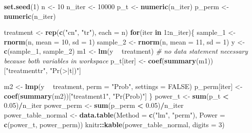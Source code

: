 \documentclass[]{book}
\newenvironment{Shaded}{\begin{snugshade}}{\end{snugshade}}
\newcommand{\CommentTok}[1]{\textcolor[rgb]{0.56,0.35,0.01}{\textit{#1}}}
\newcommand{\ControlFlowTok}[1]{\textcolor[rgb]{0.13,0.29,0.53}{\textbf{#1}}}
\newcommand{\DataTypeTok}[1]{\textcolor[rgb]{0.13,0.29,0.53}{#1}}
\newcommand{\DecValTok}[1]{\textcolor[rgb]{0.00,0.00,0.81}{#1}}
\newcommand{\FloatTok}[1]{\textcolor[rgb]{0.00,0.00,0.81}{#1}}
\newcommand{\KeywordTok}[1]{\textcolor[rgb]{0.13,0.29,0.53}{\textbf{#1}}}
\newcommand{\NormalTok}[1]{#1}
\newcommand{\OperatorTok}[1]{\textcolor[rgb]{0.81,0.36,0.00}{\textbf{#1}}}
\newcommand{\OtherTok}[1]{\textcolor[rgb]{0.56,0.35,0.01}{#1}}
\newcommand{\StringTok}[1]{\textcolor[rgb]{0.31,0.60,0.02}{#1}}
\begin{document}
\begin{Shaded}
\begin{Highlighting}[]
\KeywordTok{set.seed}\NormalTok{(}\DecValTok{1}\NormalTok{)}
\NormalTok{n <-}\StringTok{ }\DecValTok{10}
\NormalTok{n_iter <-}\StringTok{ }\DecValTok{10000}
\NormalTok{p_t <-}\StringTok{ }\KeywordTok{numeric}\NormalTok{(n_iter)}
\NormalTok{p_perm <-}\StringTok{ }\KeywordTok{numeric}\NormalTok{(n_iter)}

\NormalTok{treatment <-}\StringTok{ }\KeywordTok{rep}\NormalTok{(}\KeywordTok{c}\NormalTok{(}\StringTok{"cn"}\NormalTok{, }\StringTok{"tr"}\NormalTok{), }\DataTypeTok{each =}\NormalTok{ n)}
\ControlFlowTok{for}\NormalTok{(iter }\ControlFlowTok{in} \DecValTok{1}\OperatorTok{:}\NormalTok{n_iter)\{}
\NormalTok{  sample_}\DecValTok{1}\NormalTok{ <-}\StringTok{ }\KeywordTok{rnorm}\NormalTok{(n, }\DataTypeTok{mean =} \DecValTok{10}\NormalTok{, }\DataTypeTok{sd =} \DecValTok{1}\NormalTok{)}
\NormalTok{  sample_}\DecValTok{2}\NormalTok{ <-}\StringTok{ }\KeywordTok{rnorm}\NormalTok{(n, }\DataTypeTok{mean =} \DecValTok{11}\NormalTok{, }\DataTypeTok{sd =} \DecValTok{1}\NormalTok{)}
\NormalTok{  y <-}\StringTok{ }\KeywordTok{c}\NormalTok{(sample_}\DecValTok{1}\NormalTok{, sample_}\DecValTok{2}\NormalTok{)}
\NormalTok{  m1 <-}\StringTok{ }\KeywordTok{lm}\NormalTok{(y }\OperatorTok{~}\StringTok{ }\NormalTok{treatment) }\CommentTok{# no data statement necessary because both variables in workspace}
\NormalTok{  p_t[iter] <-}\StringTok{ }\KeywordTok{coef}\NormalTok{(}\KeywordTok{summary}\NormalTok{(m1))[}\StringTok{"treatmenttr"}\NormalTok{, }\StringTok{"Pr(>|t|)"}\NormalTok{]}
  
\NormalTok{  m2 <-}\StringTok{ }\KeywordTok{lmp}\NormalTok{(y }\OperatorTok{~}\StringTok{ }\NormalTok{treatment,}
            \DataTypeTok{perm =} \StringTok{"Prob"}\NormalTok{,}
            \DataTypeTok{settings =} \OtherTok{FALSE}\NormalTok{)}
\NormalTok{  p_perm[iter] <-}\StringTok{ }\KeywordTok{coef}\NormalTok{(}\KeywordTok{summary}\NormalTok{(m2))[}\StringTok{"treatment1"}\NormalTok{, }\StringTok{"Pr(Prob)"}\NormalTok{]}
\NormalTok{\}}
\NormalTok{power_t <-}\StringTok{ }\KeywordTok{sum}\NormalTok{(p_t }\OperatorTok{<}\StringTok{ }\FloatTok{0.05}\NormalTok{)}\OperatorTok{/}\NormalTok{n_iter}
\NormalTok{power_perm <-}\StringTok{ }\KeywordTok{sum}\NormalTok{(p_perm }\OperatorTok{<}\StringTok{ }\FloatTok{0.05}\NormalTok{)}\OperatorTok{/}\NormalTok{n_iter}
\NormalTok{power_table_normal <-}\StringTok{ }\KeywordTok{data.table}\NormalTok{(}\DataTypeTok{Method =} \KeywordTok{c}\NormalTok{(}\StringTok{"lm"}\NormalTok{, }\StringTok{"perm"}\NormalTok{),}
                         \DataTypeTok{Power =} \KeywordTok{c}\NormalTok{(power_t, power_perm))}
\NormalTok{knitr}\OperatorTok{::}\KeywordTok{kable}\NormalTok{(power_table_normal, }\DataTypeTok{digits =} \DecValTok{3}\NormalTok{)}
\end{Highlighting}
\end{Shaded}
\end{document}
